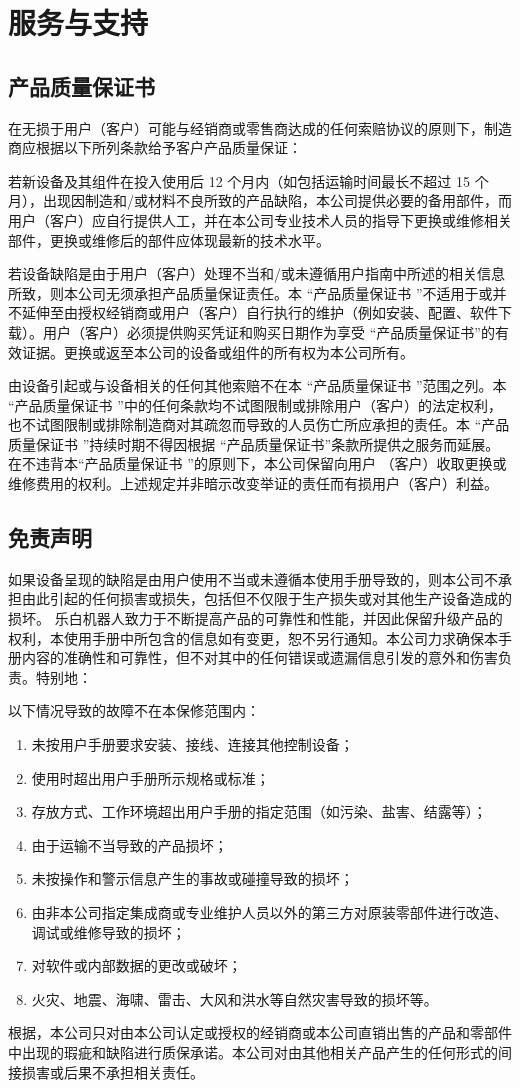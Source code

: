 \chapter{服务与支持}

\section{产品质量保证书}
\label{sec:产品质量保证书}
在无损于用户（客户）可能与经销商或零售商达成的任何索赔协议的原则下，制造商应根据以下所列条款给予客户产品质量保证：

若新设备及其组件在投入使用后 12 个月内（如包括运输时间最长不超过 15 个月），出现因制造和/或材料不良所致的产品缺陷，本公司提供必要的备用部件，而用户（客户）应自行提供人工，并在本公司专业技术人员的指导下更换或维修相关部件，更换或维修后的部件应体现最新的技术水平。

若设备缺陷是由于用户（客户）处理不当和/或未遵循用户指南中所述的相关信息所致，则本公司无须承担产品质量保证责任。本 “产品质量保证书 ”不适用于或并不延伸至由授权经销商或用户（客户）自行执行的维护（例如安装、配置、软件下载）。用户（客户）必须提供购买凭证和购买日期作为享受 “产品质量保证书”的有效证据。更换或返至本公司的设备或组件的所有权为本公司所有。

由设备引起或与设备相关的任何其他索赔不在本 “产品质量保证书 ”范围之列。本 “产品质量保证书 ”中的任何条款均不试图限制或排除用户（客户）的法定权利，也不试图限制或排除制造商对其疏忽而导致的人员伤亡所应承担的责任。本 “产品质量保证书 ”持续时期不得因根据 “产品质量保证书”条款所提供之服务而延展。在不违背本“产品质量保证书 ”的原则下，本公司保留向用户 （客户）收取更换或维修费用的权利。上述规定并非暗示改变举证的责任而有损用户（客户）利益。

\section{免责声明}
如果设备呈现的缺陷是由用户使用不当或未遵循本使用手册导致的，则本公司不承担由此引起的任何损害或损失，包括但不仅限于生产损失或对其他生产设备造成的损坏。
乐白机器人致力于不断提高产品的可靠性和性能，并因此保留升级产品的权利，本使用手册中所包含的信息如有变更，恕不另行通知。本公司力求确保本手册内容的准确性和可靠性，但不对其中的任何错误或遗漏信息引发的意外和伤害负责。特别地：

以下情况导致的故障不在本保修范围内：
\begin{enumerate}
\item 未按用户手册要求安装、接线、连接其他控制设备；
\item 使用时超出用户手册所示规格或标准；
\item 存放方式、工作环境超出用户手册的指定范围（如污染、盐害、结露等）；
\item 由于运输不当导致的产品损坏；
\item 未按操作和警示信息产生的事故或碰撞导致的损坏；
\item 由非本公司指定集成商或专业维护人员以外的第三方对原装零部件进行改造、调试或维修导致的损坏；
\item 对软件或内部数据的更改或破坏；
\item 火灾、地震、海啸、雷击、大风和洪水等自然灾害导致的损坏等。
\end{enumerate}

根据，本公司只对由本公司认定或授权的经销商或本公司直销出售的产品和零部件中出现的瑕疵和缺陷进行质保承诺。本公司对由其他相关产品产生的任何形式的间接损害或后果不承担相关责任。
